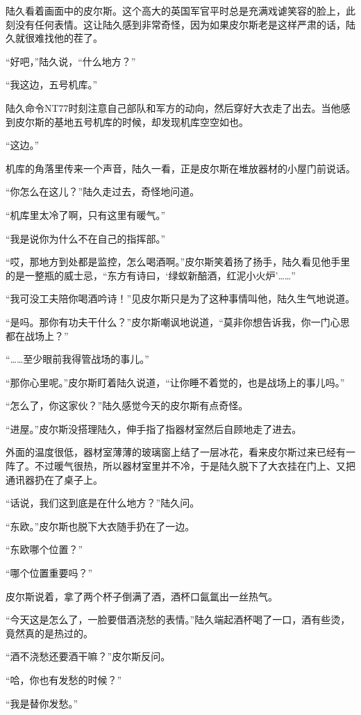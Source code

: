 陆久看着画面中的皮尔斯。这个高大的英国军官平时总是充满戏谑笑容的脸上，此刻没有任何表情。这让陆久感到非常奇怪，因为如果皮尔斯老是这样严肃的话，陆久就很难找他的茬了。

“好吧，”陆久说，“什么地方？”

“我这边，五号机库。”



陆久命令NT77时刻注意自己部队和军方的动向，然后穿好大衣走了出去。当他感到皮尔斯的基地五号机库的时候，却发现机库空空如也。

“这边。”

机库的角落里传来一个声音，陆久一看，正是皮尔斯在堆放器材的小屋门前说话。

“你怎么在这儿？”陆久走过去，奇怪地问道。

“机库里太冷了啊，只有这里有暖气。”

“我是说你为什么不在自己的指挥部。”

“哎，那地方到处都是监控，怎么喝酒啊。”皮尔斯笑着扬了扬手，陆久看见他手里的是一整瓶的威士忌，“东方有诗曰，‘绿蚁新醅酒，红泥小火炉’……”

“我可没工夫陪你喝酒吟诗！”见皮尔斯只是为了这种事情叫他，陆久生气地说道。

“是吗。那你有功夫干什么？”皮尔斯嘲讽地说道，“莫非你想告诉我，你一门心思都在战场上？”

“……至少眼前我得管战场的事儿。”

“那你心里呢。”皮尔斯盯着陆久说道，“让你睡不着觉的，也是战场上的事儿吗。”

“怎么了，你这家伙？”陆久感觉今天的皮尔斯有点奇怪。

“进屋。”皮尔斯没搭理陆久，伸手指了指器材室然后自顾地走了进去。

外面的温度很低，器材室薄薄的玻璃窗上结了一层冰花，看来皮尔斯过来已经有一阵了。不过暖气很热，所以器材室里并不冷，于是陆久脱下了大衣挂在门上、又把通讯器扔在了桌子上。

“话说，我们这到底是在什么地方？”陆久问。

“东欧。”皮尔斯也脱下大衣随手扔在了一边。

“东欧哪个位置？”

“哪个位置重要吗？”

皮尔斯说着，拿了两个杯子倒满了酒，酒杯口氤氲出一丝热气。

“今天这是怎么了，一脸要借酒浇愁的表情。”陆久端起酒杯喝了一口，酒有些烫，竟然真的是热过的。

“酒不浇愁还要酒干嘛？”皮尔斯反问。

“哈，你也有发愁的时候？”

“我是替你发愁。”

